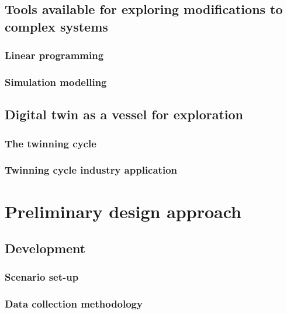 \documentclass[a4paper,11pt,fleqn]{report}
\begin{document}
\section{Tools available for exploring modifications to complex systems}



\subsection{Linear programming}



\subsection{Simulation modelling}


\section{Digital twin as a vessel for exploration}


\subsection{The twinning cycle}



\subsection{Twinning cycle industry application}


\chapter{Preliminary design approach}



\section{Development}



\subsection{Scenario set-up}



\subsection{Data collection methodology} 


 
\end{document}
